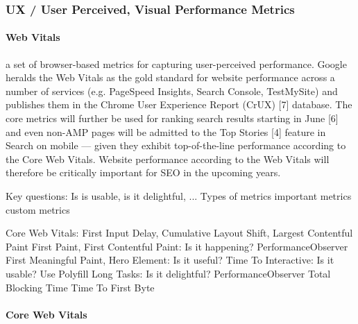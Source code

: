 \subsubsection{UX / User Perceived, Visual Performance Metrics}









\paragraph{Web Vitals}


a set of browser-based metrics for capturing user-perceived performance. Google heralds the Web Vitals as the gold standard for website performance across a number of services (e.g. PageSpeed Insights, Search Console, TestMySite) and publishes them in the Chrome User Experience Report (CrUX) [7] database. The core metrics will further be used for ranking search results starting in June [6] and even non-AMP pages will be admitted to the Top Stories [4] feature in Search on mobile — given they exhibit top-of-the-line performance according to the Core Web Vitals. Website performance according to the Web Vitals will therefore be critically important for SEO in the upcoming years.





 Key questions: Is is usable, is it delightful, ...
 Types of metrics
 important metrics
 custom metrics


 Core Web Vitals: First Input Delay, Cumulative Layout Shift, Largest Contentful Paint
 First Paint, First Contentful Paint: Is it happening? PerformanceObserver
 First Meaningful Paint, Hero Element: Is it useful? 
 Time To Interactive: Is it usable? Use Polyfill
 Long Tasks: Is it delightful? PerformanceObserver
 Total Blocking Time
 Time To First Byte



\paragraph{Core Web Vitals}


